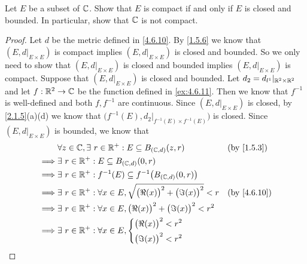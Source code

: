 \begin{ex}\label{ex:4.6.13}
  Let \(E\) be a subset of \(\mathbb{C}\).
  Show that \(E\) is compact if and only if \(E\) is closed and bounded.
  In particular, show that \(\mathbb{C}\) is not compact.
\end{ex}

\begin{proof}
  Let \(d\) be the metric defined in \cref{4.6.10}.
  By \cref{1.5.6} we know that \((E, d|_{E \times E})\) is compact implies \((E, d|_{E \times E})\) is closed and bounded.
  So we only need to show that \((E, d|_{E \times E})\) is closed and bounded implies \((E, d|_{E \times E})\) is compact.
  Suppose that \((E, d|_{E \times E})\) is closed and bounded.
  Let \(d_2 = d_{l^1}|_{\mathbb{R}^2 \times \mathbb{R}^2}\) and let \(f : \mathbb{R}^2 \to \mathbb{C}\) be the function defined in \cref{ex:4.6.11}.
  Then we know that \(f^{-1}\) is well-defined and both \(f, f^{-1}\) are continuous.
  Since \((E, d|_{E \times E})\) is closed, by \cref{2.1.5}(a)(d) we know that \(\big(f^{-1}(E), d_2|_{f^{-1}(E) \times f^{-1}(E)}\big)\) is closed.
  Since \((E, d|_{E \times E})\) is bounded, we know that
  \begin{align*}
             & \forall z \in \C, \exists\ r \in \R^+ : E \subseteq B_{(\C, d)}(z, r)                     &  & \by{1.5.3}                \\
    \implies & \exists\ r \in \R^+ : E \subseteq B_{(\C, d)}(0, r)                                                                      \\
    \implies & \exists\ r \in \R^+ : f^{-1}(E) \subseteq f^{-1}\big(B_{(\C, d)}(0, r)\big)                                              \\
    \implies & \exists\ r \in \R^+ : \forall x \in E, \sqrt{\big(\Re(x)\big)^2 + \big(\Im(x)\big)^2} < r &  & \text{(by \cref{4.6.10})} \\
    \implies & \exists\ r \in \R^+ : \forall x \in E, \big(\Re(x)\big)^2 + \big(\Im(x)\big)^2 < r^2                                     \\
    \implies & \exists\ r \in \R^+ : \forall x \in E, \begin{dcases}
                                                        \big(\Re(x)\big)^2 < r^2 \\
                                                        \big(\Im(x)\big)^2 < r^2
                                                      \end{dcases}                                                          \\

\end{align*}
\end{proof}
